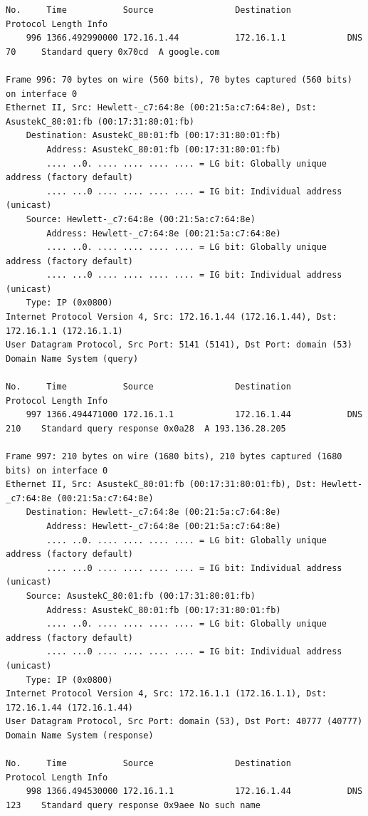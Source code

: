 \documentclass[a4paper,11pt]{article}
\begin{document}
\begin{lstlisting}
No.     Time           Source                Destination           Protocol Length Info
    996 1366.492990000 172.16.1.44           172.16.1.1            DNS      70     Standard query 0x70cd  A google.com

Frame 996: 70 bytes on wire (560 bits), 70 bytes captured (560 bits) on interface 0
Ethernet II, Src: Hewlett-_c7:64:8e (00:21:5a:c7:64:8e), Dst: AsustekC_80:01:fb (00:17:31:80:01:fb)
    Destination: AsustekC_80:01:fb (00:17:31:80:01:fb)
        Address: AsustekC_80:01:fb (00:17:31:80:01:fb)
        .... ..0. .... .... .... .... = LG bit: Globally unique address (factory default)
        .... ...0 .... .... .... .... = IG bit: Individual address (unicast)
    Source: Hewlett-_c7:64:8e (00:21:5a:c7:64:8e)
        Address: Hewlett-_c7:64:8e (00:21:5a:c7:64:8e)
        .... ..0. .... .... .... .... = LG bit: Globally unique address (factory default)
        .... ...0 .... .... .... .... = IG bit: Individual address (unicast)
    Type: IP (0x0800)
Internet Protocol Version 4, Src: 172.16.1.44 (172.16.1.44), Dst: 172.16.1.1 (172.16.1.1)
User Datagram Protocol, Src Port: 5141 (5141), Dst Port: domain (53)
Domain Name System (query)

No.     Time           Source                Destination           Protocol Length Info
    997 1366.494471000 172.16.1.1            172.16.1.44           DNS      210    Standard query response 0x0a28  A 193.136.28.205

Frame 997: 210 bytes on wire (1680 bits), 210 bytes captured (1680 bits) on interface 0
Ethernet II, Src: AsustekC_80:01:fb (00:17:31:80:01:fb), Dst: Hewlett-_c7:64:8e (00:21:5a:c7:64:8e)
    Destination: Hewlett-_c7:64:8e (00:21:5a:c7:64:8e)
        Address: Hewlett-_c7:64:8e (00:21:5a:c7:64:8e)
        .... ..0. .... .... .... .... = LG bit: Globally unique address (factory default)
        .... ...0 .... .... .... .... = IG bit: Individual address (unicast)
    Source: AsustekC_80:01:fb (00:17:31:80:01:fb)
        Address: AsustekC_80:01:fb (00:17:31:80:01:fb)
        .... ..0. .... .... .... .... = LG bit: Globally unique address (factory default)
        .... ...0 .... .... .... .... = IG bit: Individual address (unicast)
    Type: IP (0x0800)
Internet Protocol Version 4, Src: 172.16.1.1 (172.16.1.1), Dst: 172.16.1.44 (172.16.1.44)
User Datagram Protocol, Src Port: domain (53), Dst Port: 40777 (40777)
Domain Name System (response)

No.     Time           Source                Destination           Protocol Length Info
    998 1366.494530000 172.16.1.1            172.16.1.44           DNS      123    Standard query response 0x9aee No such name


\end{lstlisting}
\end{document}
